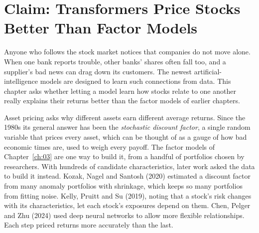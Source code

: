 \makeatletter
{}
\makeatother

\makeatletter
\makeatother

\chapter{Claim: Transformers Price Stocks Better Than Factor Models}
\label{ch:22}
\providecommand{\term}[1]{\emph{#1}}

Anyone who follows the stock market notices that companies do not move alone. When one bank reports trouble, other banks' shares often fall too, and a supplier's bad news can drag down its customers. The newest artificial-intelligence models are designed to learn such connections from data. This chapter asks whether letting a model learn how stocks relate to one another really explains their returns better than the factor models of earlier chapters.

Asset pricing asks why different assets earn different average returns. Since the 1980s its general answer has been the \term{stochastic discount factor}, a single random variable that prices every asset, which can be thought of as a gauge of how bad economic times are, used to weigh every payoff. The factor models of Chapter~\ref{ch:03} are one way to build it, from a handful of portfolios chosen by researchers. With hundreds of candidate characteristics, later work asked the data to build it instead. Kozak, Nagel and Santosh (2020) estimated a discount factor from many anomaly portfolios with shrinkage, which keeps so many portfolios from fitting noise. Kelly, Pruitt and Su (2019), noting that a stock's risk changes with its characteristics, let each stock's exposures depend on them. Chen, Pelger and Zhu (2024) used deep neural networks to allow more flexible relationships. Each step priced returns more accurately than the last.

